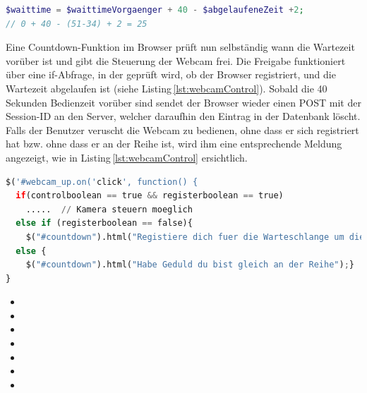 \vspace{3mm}
\begin{lstlisting}[label=lst:wartezeit,caption=Berechnung der Wartezeit, language=PHP, style=PHP]
$waittime = $waittimeVorgaenger + 40 - $abgelaufeneZeit +2;
// 0 + 40 - (51-34) + 2 = 25
\end{lstlisting}
\vspace{3mm}

\noindent
Eine Countdown-Funktion im Browser prüft nun selbständig wann die Wartezeit vorüber ist und gibt die Steuerung der Webcam frei. Die Freigabe funktioniert über eine if-Abfrage, in der geprüft wird, ob der Browser registriert, und die Wartezeit abgelaufen ist (siehe Listing\,\ref{lst:webcamControl}).
Sobald die 40\,Sekunden Bedienzeit vorüber sind sendet der Browser wieder einen POST mit der Session-ID an den Server, welcher daraufhin den Eintrag in der Datenbank löscht. Falls der Benutzer veruscht die Webcam zu bedienen, ohne dass er sich registriert hat bzw. ohne dass er an der Reihe ist, wird ihm eine entsprechende Meldung angezeigt, wie in Listing\,\ref{lst:webcamControl} ersichtlich.

\vspace{3mm}
\begin{lstlisting}[label=lst:webcamControl, caption=Freigabe der Webcam-Steuerung,language=Python, style=py]
$('#webcam_up.on('click', function() {
  if(controlboolean == true && registerboolean == true)
    .....  // Kamera steuern moeglich
  else if (registerboolean == false){
    $("#countdown").html("Registiere dich fuer die Warteschlange um die Kamera zu bedienen");}
  else {
    $("#countdown").html("Habe Geduld du bist gleich an der Reihe");}
}
\end{lstlisting}
\vspace{3mm}


\begin{itemize}
\item {}
\item {}
\item {}
\item {}
\item {}
\item {}
\item {}
\end{itemize}
